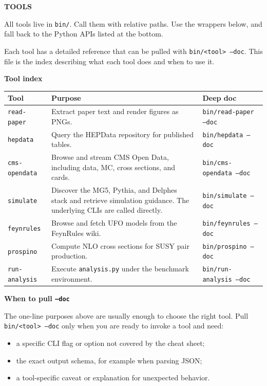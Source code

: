 \documentclass{article}
\begin{document}
\vspace{10pt}

\begin{agentcard}
\small
\textbf{TOOLS}

All tools live in \texttt{bin/}. Call them with relative paths. Use the wrappers below, and fall back to the Python APIs listed at the bottom.

Each tool has a detailed reference that can be pulled with \texttt{bin/<tool> --doc}. This file is the index describing what each tool does and when to use it.

\medskip
\textbf{Tool index}
\begin{center}
\scriptsize
\begin{tabularx}{0.98\linewidth}{lXl}
\toprule
Tool & Purpose & Deep doc \\
\midrule
\texttt{read-paper}
& Extract paper text and render figures as PNGs.
& \texttt{bin/read-paper --doc} \\

\texttt{hepdata}
& Query the HEPData repository for published tables.
& \texttt{bin/hepdata --doc} \\

\texttt{cms-opendata}
& Browse and stream CMS Open Data, including data, MC, cross sections, and cards.
& \texttt{bin/cms-opendata --doc} \\

\texttt{simulate}
& Discover the MG5, Pythia, and Delphes stack and retrieve simulation guidance. The underlying CLIs are called directly.
& \texttt{bin/simulate --doc} \\

\texttt{feynrules}
& Browse and fetch UFO models from the FeynRules wiki.
& \texttt{bin/feynrules --doc} \\

\texttt{prospino}
& Compute NLO cross sections for SUSY pair production.
& \texttt{bin/prospino --doc} \\

\texttt{run-analysis}
& Execute \texttt{analysis.py} under the benchmark environment.
& \texttt{bin/run-analysis --doc} \\
\bottomrule
\end{tabularx}
\end{center}
\medskip
\textbf{When to pull \texttt{--doc}}

The one-line purposes above are usually enough to choose the right tool. Pull \texttt{bin/<tool> --doc} only when you are ready to invoke a tool and need:
\begin{itemize}
    \item a specific CLI flag or option not covered by the cheat sheet;
    \item the exact output schema, for example when parsing JSON;
    \item a tool-specific caveat or explanation for unexpected behavior.
\end{itemize}


\end{agentcard}
\end{document}

